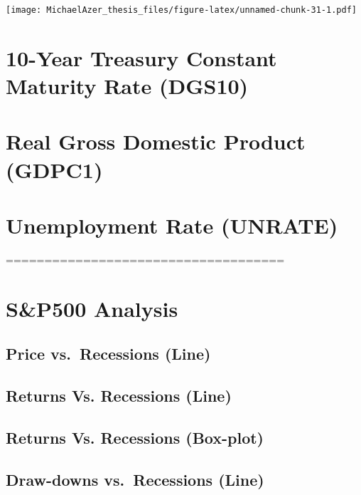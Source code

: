 \documentclass[]{book}
\begin{document}
\texttt{[image: MichaelAzer\_thesis\_files/figure-latex/unnamed-chunk-31-1.pdf]}

\hypertarget{year-treasury-constant-maturity-rate-dgs10}{%
\section{10-Year Treasury Constant Maturity Rate (DGS10)}\label{year-treasury-constant-maturity-rate-dgs10}}

\hypertarget{real-gross-domestic-product-gdpc1}{%
\section{Real Gross Domestic Product (GDPC1)}\label{real-gross-domestic-product-gdpc1}}

\hypertarget{unemployment-rate-unrate}{%
\section{Unemployment Rate (UNRATE)}\label{unemployment-rate-unrate}}

====================================

\hypertarget{sp500-analysis}{%
\section{S\&P500 Analysis}\label{sp500-analysis}}

\hypertarget{price-vs.recessions-line}{%
\subsection{Price vs.~Recessions (Line)}\label{price-vs.recessions-line}}

\hypertarget{returns-vs.-recessions-line}{%
\subsection{Returns Vs. Recessions (Line)}\label{returns-vs.-recessions-line}}

\hypertarget{returns-vs.-recessions-box-plot}{%
\subsection{Returns Vs. Recessions (Box-plot)}\label{returns-vs.-recessions-box-plot}}

\hypertarget{draw-downs-vs.recessions-line}{%
\subsection{Draw-downs vs.~Recessions (Line)}\label{draw-downs-vs.recessions-line}}
\end{document}
